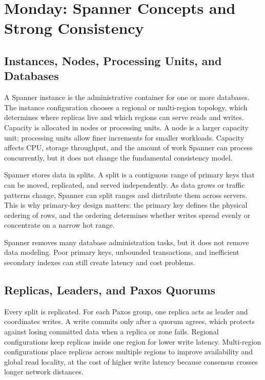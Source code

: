 \section{Monday: Spanner Concepts and Strong Consistency}

\subsection{Instances, Nodes, Processing Units, and Databases}
A Spanner instance is the administrative container for one or more databases. The instance configuration chooses a regional or multi-region topology, which determines where replicas live and which regions can serve reads and writes. Capacity is allocated in nodes or processing units. A node is a larger capacity unit; processing units allow finer increments for smaller workloads. Capacity affects CPU, storage throughput, and the amount of work Spanner can process concurrently, but it does not change the fundamental consistency model.

Spanner stores data in splits. A split is a contiguous range of primary keys that can be moved, replicated, and served independently. As data grows or traffic patterns change, Spanner can split ranges and distribute them across servers. This is why primary-key design matters: the primary key defines the physical ordering of rows, and the ordering determines whether writes spread evenly or concentrate on a narrow hot range.

\begin{notebox}
Spanner removes many database administration tasks, but it does not remove data modeling. Poor primary keys, unbounded transactions, and inefficient secondary indexes can still create latency and cost problems.
\end{notebox}

\subsection{Replicas, Leaders, and Paxos Quorums}
Every split is replicated. For each Paxos group, one replica acts as leader and coordinates writes. A write commits only after a quorum agrees, which protects against losing committed data when a replica or zone fails. Regional configurations keep replicas inside one region for lower write latency. Multi-region configurations place replicas across multiple regions to improve availability and global read locality, at the cost of higher write latency because consensus crosses longer network distances.


